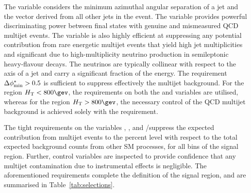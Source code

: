 The \dphi variable considers the minimum azimuthal angular separation
of a jet and the \mht vector derived from all other jets in the
event. The \dphi variable provides powerful discriminating power
between final states with genuine \ptvecmiss and mismeasured QCD
multijet events. The variable is also highly efficient at suppressing
any potential contribution from rare energetic multijet events that
yield high jet multiplicities and significant \ETmiss due to
high-multiplicity neutrino production in semileptonic heavy-flavour
decays. The neutrinos are typically collinear with respect to the axis
of a jet and carry a significant fraction of the energy. The
requirement $\Delta\phi^{*}_{\rm min} > 0.5$ is sufficient to suppress effectively the
multijet background. For the region $\scalht < 800\gev$, the
requirements on both the \alphat and \dphi variables are utilised,
whereas for the region $\scalht > 800\gev$, the necessary control of
the QCD multijet background is achieved solely with the \dphi
requirement.

The tight requirements on the variables \alphat, \dphi, and
\HTmiss/\ETmiss suppress the expected contribution from multijet
events to the percent level with respect to the total expected
background counts from other SM processes, for all bins of the signal
region. Further, control variables are inspected to provide confidence
that any multijet contamination due to instrumental effects is
negligible. The aforementioned requirements complete the definition of
the signal region, and are summarised in Table~\ref{tab:selections}.



